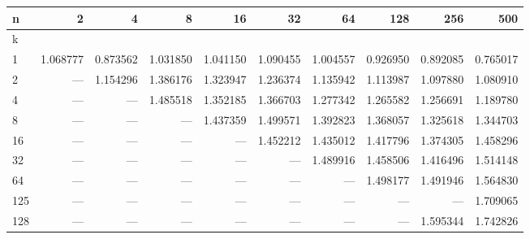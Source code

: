 \begin{tabular}{lrrrrrrrrr}
\toprule
{n} &       2   &       4   &       8   &       16  &       32  &       64  &       128 &       256 &       500 \\
\midrule
k   &           &           &           &           &           &           &           &           &           \\
1   &  1.068777 &  0.873562 &  1.031850 &  1.041150 &  1.090455 &  1.004557 &  0.926950 &  0.892085 &  0.765017 \\
2   &       --- &  1.154296 &  1.386176 &  1.323947 &  1.236374 &  1.135942 &  1.113987 &  1.097880 &  1.080910 \\
4   &       --- &       --- &  1.485518 &  1.352185 &  1.366703 &  1.277342 &  1.265582 &  1.256691 &  1.189780 \\
8   &       --- &       --- &       --- &  1.437359 &  1.499571 &  1.392823 &  1.368057 &  1.325618 &  1.344703 \\
16  &       --- &       --- &       --- &       --- &  1.452212 &  1.435012 &  1.417796 &  1.374305 &  1.458296 \\
32  &       --- &       --- &       --- &       --- &       --- &  1.489916 &  1.458506 &  1.416496 &  1.514148 \\
64  &       --- &       --- &       --- &       --- &       --- &       --- &  1.498177 &  1.491946 &  1.564830 \\
125 &       --- &       --- &       --- &       --- &       --- &       --- &       --- &       --- &  1.709065 \\
128 &       --- &       --- &       --- &       --- &       --- &       --- &       --- &  1.595344 &  1.742826 \\
\bottomrule
\end{tabular}
